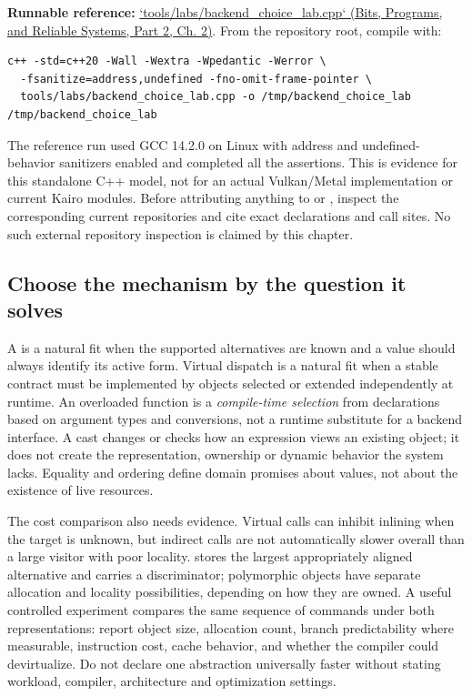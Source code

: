 \textbf{Runnable reference:} \href{../01-Bits-Programs-and-Reliable-Systems-P02/main.pdf\#nameddest=source-file-9e5ff4ba88e6efabc938832a}{`tools/labs/backend\_choice\_lab.cpp` (Bits, Programs, and Reliable Systems, Part 2, Ch. 2)}. From the repository root, compile with:

\begin{verbatim}
c++ -std=c++20 -Wall -Wextra -Wpedantic -Werror \
  -fsanitize=address,undefined -fno-omit-frame-pointer \
  tools/labs/backend_choice_lab.cpp -o /tmp/backend_choice_lab
/tmp/backend_choice_lab
\end{verbatim}

The reference run used GCC 14.2.0 on Linux with address and undefined-behavior sanitizers enabled and completed all the assertions. This is evidence for this standalone C++ model, not for an actual Vulkan/Metal implementation or current Kairo modules. Before attributing anything to  or , inspect the corresponding current repositories and cite exact declarations and call sites. No such external repository inspection is claimed by this chapter.

\subsection{Choose the mechanism by the question it solves}\label{01-foundations-i-ch004-choose-the-mechanism-by-the-question-it-solves}

\hypertarget{01-foundations-i-ch004-choose-the-mechanism-by-the-question-it-solves}{}

A \BookInlineCode{variant} is a natural fit when the supported alternatives are known and a value should always identify its active form. Virtual dispatch is a natural fit when a stable contract must be implemented by objects selected or extended independently at runtime. An overloaded function is a \emph{compile-time selection} from declarations based on argument types and conversions, not a runtime substitute for a backend interface. A cast changes or checks how an expression views an existing object; it does not create the representation, ownership or dynamic behavior the system lacks. Equality and ordering define domain promises about values, not about the existence of live resources.

The cost comparison also needs evidence. Virtual calls can inhibit inlining when the target is unknown, but indirect calls are not automatically slower overall than a large \BookInlineCode{variant} visitor with poor locality. \BookInlineCode{variant} stores the largest appropriately aligned alternative and carries a discriminator; polymorphic objects have separate allocation and locality possibilities, depending on how they are owned. A useful controlled experiment compares the same sequence of commands under both representations: report object size, allocation count, branch predictability where measurable, instruction cost, cache behavior, and whether the compiler could devirtualize. Do not declare one abstraction universally faster without stating workload, compiler, architecture and optimization settings.

